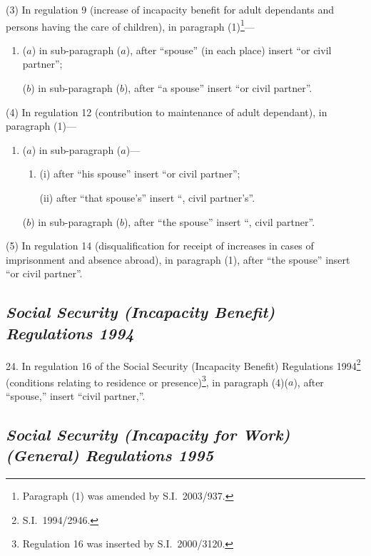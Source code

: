 \documentclass[12pt,a4paper]{article}
\begin{document}
(3) In regulation 9 (increase of incapacity benefit for adult dependants and persons having the care of children), in paragraph (1)\footnote{Paragraph (1) was amended by S.I.\ 2003/937.}—
\begin{enumerate}\item[]
($a$) in sub-paragraph ($a$), after “spouse” (in each place) insert “or civil partner”;

($b$) in sub-paragraph ($b$), after “a spouse” insert “or civil partner”.
\end{enumerate}

(4) In regulation 12 (contribution to maintenance of adult dependant), in paragraph (1)—
\begin{enumerate}\item[]
($a$) in sub-paragraph ($a$)—
\begin{enumerate}\item[]
(i) after “his spouse” insert “or civil partner”;

(ii) after “that spouse's” insert “, civil partner's”.
\end{enumerate}

($b$) in sub-paragraph ($b$), after “the spouse” insert “, civil partner”.
\end{enumerate}

(5) In regulation 14 (disqualification for receipt of increases in cases of imprisonment and absence abroad), in paragraph (1), after “the spouse” insert “or civil partner”.

\subsection*{\itshape Social Security (Incapacity Benefit) Regulations 1994}

24.  In regulation 16 of the Social Security (Incapacity Benefit) Regulations 1994\footnote{S.I.\ 1994/2946.} (conditions relating to residence or presence)\footnote{Regulation 16 was inserted by S.I.\ 2000/3120.}, in paragraph (4)($a$), after “spouse,” insert “civil partner,”.

\subsection*{\itshape Social Security (Incapacity for Work) (General) Regulations 1995}
\end{document}
